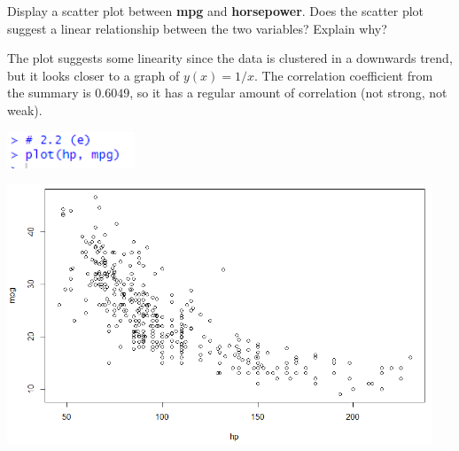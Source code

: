 Display a scatter plot between \textbf{mpg} and \textbf{horsepower}. Does the scatter plot suggest
a linear relationship between the two variables? Explain why?

\soln* The plot suggests some linearity since the data is clustered in a downwards trend, but it looks closer to a graph of $y(x)=1/x$. The correlation coefficient from the summary is $0.6049$, so it has a regular amount of correlation (not strong, not weak).

\nl \includegraphics*[width=1.5in]{img/2_2e_code.PNG}

\nl \includegraphics*[width=5in]{img/2_2e_plot.PNG}